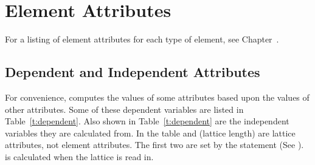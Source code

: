 \chapter {Element Attributes}
\label{c:attrib}

For a listing of element attributes for each type of element, see Chapter~.

\section{Dependent and Independent Attributes} 
\label{s:depend} 

For convenience, \bmad computes the values of some attributes based upon the values of other
attributes. Some of these dependent variables are listed in Table~\ref{t:dependent}. Also shown in
Table~\ref{t:dependent} are the independent variables they are calculated from.  In the table
 and  (lattice length) are lattice attributes, not element attributes. The
first two are set by the  statement (See ).  is calculated
when the lattice is read in.

